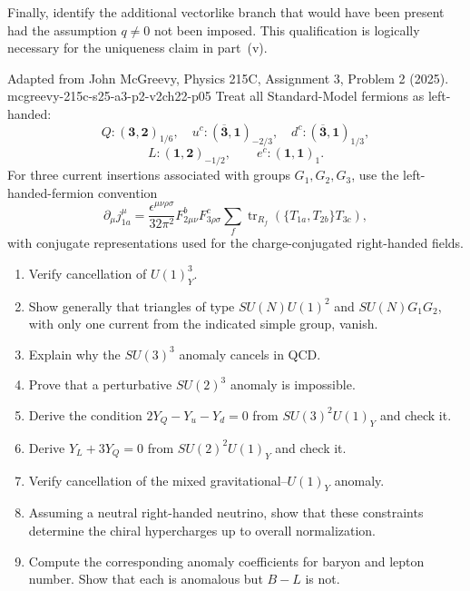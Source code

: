 \begin{enumerate}
  Finally, identify the additional vectorlike branch that would have been
  present had the assumption \(q\ne0\) not been imposed.  This qualification
  is logically necessary for the uniqueness claim in part~(v).

  {Adapted from John McGreevy, Physics 215C, Assignment 3, Problem 2 (2025).}
  {mcgreevy-215c-s25-a3-p2-v2ch22-p05}
  Treat all Standard-Model fermions as left-handed:
  \[
    Q:(\mathbf3,\mathbf2)_{1/6},\quad
    u^c:(\overline{\mathbf3},\mathbf{1})_{-2/3},\quad
    d^c:(\overline{\mathbf3},\mathbf{1})_{1/3},
  \]
  \[
    L:(\mathbf{1},\mathbf2)_{-1/2},\qquad
    e^c:(\mathbf{1},\mathbf{1})_1.
  \]
  For three current insertions associated with groups
  \(G_1,G_2,G_3\), use the left-handed-fermion convention
  \[
    \partial_\mu j_{1a}^{\mu}
      =\frac{\epsilon^{\mu\nu\rho\sigma}}{32\pi^2}
       F^b_{2\mu\nu}F^c_{3\rho\sigma}
       \sum_f\operatorname{tr}_{R_f}
       \left(\{T_{1a},T_{2b}\}T_{3c}\right),
  \]
  with conjugate representations used for the charge-conjugated
  right-handed fields.
  \begin{enumerate}
    \item[(a)] Verify cancellation of \(U(1)_Y^3\).
    \item[(b)] Show generally that triangles of type
      \(SU(N)U(1)^2\) and \(SU(N)G_1G_2\), with only one current from the
      indicated simple group, vanish.
    \item[(c)] Explain why the \(SU(3)^3\) anomaly cancels in QCD.
    \item[(d)] Prove that a perturbative \(SU(2)^3\) anomaly is impossible.
    \item[(e)] Derive the condition
      \(2Y_Q-Y_u-Y_d=0\) from \(SU(3)^2U(1)_Y\) and check it.
    \item[(f)] Derive \(Y_L+3Y_Q=0\) from
      \(SU(2)^2U(1)_Y\) and check it.
    \item[(g)] Verify cancellation of the mixed
      gravitational--\(U(1)_Y\) anomaly.
    \item[(h)] Assuming a neutral right-handed neutrino, show that these
      constraints determine the chiral hypercharges up to overall
      normalization.
    \item[(i)] Compute the corresponding anomaly coefficients for baryon
      and lepton number.  Show that each is anomalous but \(B-L\) is not.
  \end{enumerate}


\end{enumerate}
